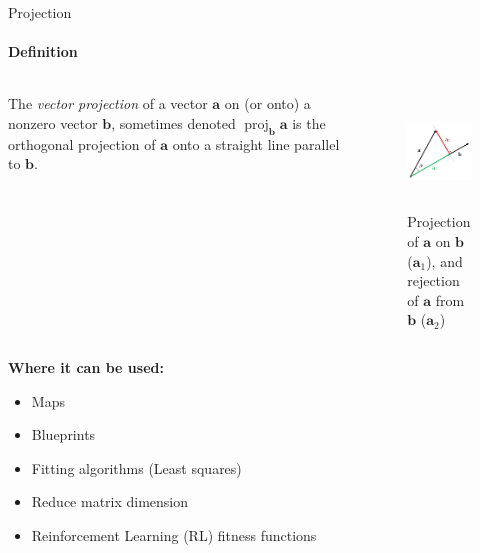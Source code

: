 \documentclass[aspectratio=169]{beamer}
\begin{document}
\begin{frame}[t]{Projection}
    \framesubtitle{Definition}
    \vspace{-0.3cm}
    \begin{columns}[T,onlytextwidth]
        \begin{column}{0.5\textwidth}
            The \textit{vector projection} of a vector $\mathbf {a}$ on (or onto) a nonzero vector $\mathbf {b}$, sometimes denoted $\operatorname {proj} _{\mathbf {b} }\mathbf {a}$  is the orthogonal projection of $\mathbf {a}$ onto a straight line parallel to $\mathbf {b}$.
        \end{column}
        \begin{column}{0.49\textwidth}
            \vspace{-1cm}
            \begin{figure}[H]
                \centering\includegraphics[height=3cm,width=1\textwidth,keepaspectratio]{Projection_and_rejection.png}
                \caption*{Projection of $\mathbf{a}$ on $\mathbf{b}$ ($\mathbf{a}_1$), and rejection of $\mathbf{a}$ from $\mathbf{b}$ ($\mathbf{a}_2$)}
                \label{fig:Projection_and_rejection.png}
            \end{figure}
        \end{column}
    \end{columns}
    \textbf{Where it can be used:}
    \vspace{-0.5cm}
    \begin{multicols}{2}
        \begin{itemize}
            \item Maps
            \item Blueprints
            \item Fitting algorithms (Least squares)
            \item Reduce matrix dimension
            \item Reinforcement Learning (RL) fitness functions
        \end{itemize}
    \end{multicols}
\end{frame}
\end{document}
